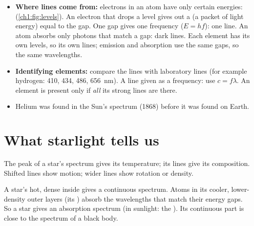 \begin{itemize}
  \item \textbf{Where lines come from:} electrons in an atom have only certain energies:  (\cref{ch1:fig:levels}). An electron that drops a level gives out a
         (a packet of light energy) equal to the gap. One gap gives one frequency
        ($E = hf$): one line. An atom absorbs only photons that match a gap: dark lines.
        Each element has its own levels, so its own lines; emission and absorption use the same
        gaps, so the same wavelengths.
  \item \textbf{Identifying elements:} compare the lines with laboratory lines (for example
        hydrogen: 410, 434, 486, \qty{656}{nm}). A line given as a frequency: use $c = f\lambda$.
        An element is present only if \emph{all} its strong lines are there.
  \item Helium was found in the Sun's spectrum (1868) before it was found on Earth.
\end{itemize}

\section{What starlight tells us}\label{ch1:sec:stars}

\begin{bigidea}
The peak of a star's spectrum gives its temperature; its lines give its composition. Shifted
lines show motion; wider lines show rotation or density.
\end{bigidea}

\begin{keywords}
\end{keywords}

A star's hot, dense inside gives a continuous spectrum. Atoms in its cooler, lower-density
outer layers (its ) absorb the wavelengths that match their energy gaps. So a
star gives an absorption spectrum (in sunlight: the ). Its continuous
part is close to the spectrum of a black body.

